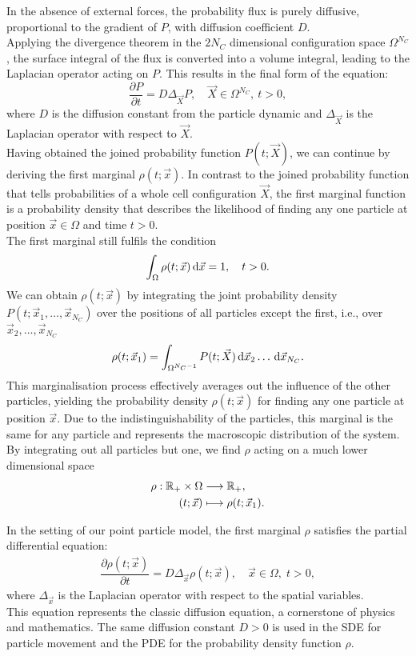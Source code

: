 In the absence of external forces, the probability flux is purely diffusive, proportional to the gradient of $P$, with diffusion coefficient $D$. \\
Applying the divergence theorem in the $2N_C$ dimensional configuration space $\Omega^{N_C}$, the surface integral of the flux is converted into a volume integral, leading to the Laplacian operator acting on $P$. 
This results in the final form of the equation:
\[
	\dfrac{\partial P}{\partial t} = D \Delta_{\vec{X}} P, \quad \vec{X} \in \Omega^{N_C}, \: t>0, 
\] 
where $D$ is the diffusion constant from the particle dynamic and $\Delta_{\vec{X}}$ is the Laplacian operator with respect to $\vec{X}$. \\
Having obtained the joined probability function $P(t; \vec{X})$, we can continue by deriving the first marginal $\rho(t; \vec{x})$. 
In contrast to the joined probability function that tells probabilities of a whole cell configuration $\vec{X}$, the first marginal function is a probability density that describes the likelihood of finding any one particle at position  $\vec{x} \in \Omega$ and time $t > 0$. \\
The first marginal still fulfils the condition 
\[
	\int_{\Omega} \rho(t; \vec{x}) \, \mathrm{d} \vec{x} = 1, \quad t > 0. 
\]
We can obtain $\rho(t; \vec{x})$ by integrating the joint probability density $P(t; \vec{x}_1, \dots, \vec{x}_{N_C})$ over the positions of all particles except the first, i.e., over $\vec{x}_2, \dots, \vec{x}_{N_C}$
\[
	\rho(t; \vec{x}_1) = \int_{\Omega^{N_C-1}}  P(t; \vec{X}) \, \mathrm{d} \vec{x}_2 \ldots \, \mathrm{d} \vec{x}_{N_C}.
\]
This marginalisation process effectively averages out the influence of the other particles, yielding the probability density $\rho(t; \vec{x})$ for finding any one particle at position $\vec{x}$. 
Due to the indistinguishability of the particles, this marginal is the same for any particle and represents the macroscopic distribution of the system.
By integrating out all particles but one, we find $\rho$ acting on a much lower dimensional space 
\begin{align*}
	\rho : \mathbb{R}_{+} \times \Omega &\longrightarrow  \mathbb{R}_+, \\	
	(t; \vec{x}) &\longmapsto  \rho(t; \vec{x}_1). 
\end{align*}	

In the setting of our point particle model, the first marginal $\rho$ satisfies the partial differential equation:
\begin{align*}
	\dfrac{\partial \rho (t; \vec{x})}{\partial t} = D \Delta_{\vec{x}} \rho(t; \vec{x}), \quad \vec{x} \in \Omega, \; t>0, 
\end{align*}
where $\Delta_{\vec{x}}$ is the Laplacian operator with respect to the spatial variables. \\
This equation represents the classic diffusion equation, a cornerstone of physics and mathematics.
The same diffusion constant $D>0$ is used in the SDE for particle movement and the PDE for the probability density function $\rho$. \\

